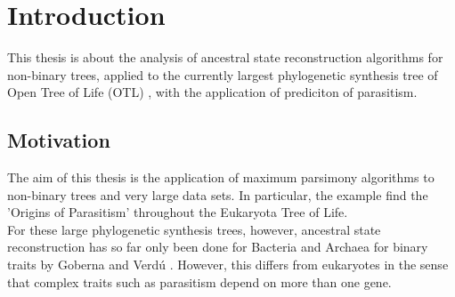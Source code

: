 \tableofcontents
\clearpage
{}

\chapter{Introduction}
  This thesis is about the analysis of ancestral state reconstruction algorithms for non-binary 
    trees, applied to the currently largest phylogenetic synthesis tree of Open Tree of Life (OTL)
    \cite{Hinchliff2015}, with the application of prediciton of parasitism. \\
  
  \section{Motivation}
    The aim of this thesis is the application of maximum parsimony algorithms to non-binary 
      trees and very large data sets. In particular, the example find the 'Origins of Parasitism' 
      throughout the Eukaryota Tree of Life. \\
    For these large phylogenetic synthesis trees, however, ancestral state reconstruction has so far 
      only been done for Bacteria and Archaea for binary traits by Goberna and Verdú \cite{Goberna2015}.
      However, this differs from eukaryotes in the sense that complex traits such as parasitism depend
      on more than one gene. \\

